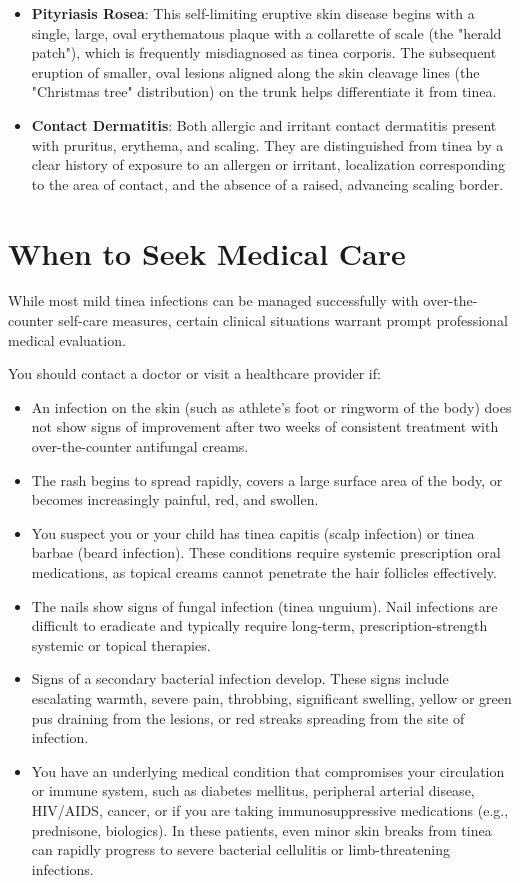 \begin{itemize}
    \item \textbf{Pityriasis Rosea}: This self-limiting eruptive skin disease begins with a single, large, oval erythematous plaque with a collarette of scale (the "herald patch"), which is frequently misdiagnosed as tinea corporis. The subsequent eruption of smaller, oval lesions aligned along the skin cleavage lines (the "Christmas tree" distribution) on the trunk helps differentiate it from tinea.
    \item \textbf{Contact Dermatitis}: Both allergic and irritant contact dermatitis present with pruritus, erythema, and scaling. They are distinguished from tinea by a clear history of exposure to an allergen or irritant, localization corresponding to the area of contact, and the absence of a raised, advancing scaling border.
\end{itemize}

\section*{When to Seek Medical Care}
While most mild tinea infections can be managed successfully with over-the-counter self-care measures, certain clinical situations warrant prompt professional medical evaluation.

You should contact a doctor or visit a healthcare provider if:
\begin{itemize}
    \item An infection on the skin (such as athlete's foot or ringworm of the body) does not show signs of improvement after two weeks of consistent treatment with over-the-counter antifungal creams.
    \item The rash begins to spread rapidly, covers a large surface area of the body, or becomes increasingly painful, red, and swollen.
    \item You suspect you or your child has tinea capitis (scalp infection) or tinea barbae (beard infection). These conditions require systemic prescription oral medications, as topical creams cannot penetrate the hair follicles effectively.
    \item The nails show signs of fungal infection (tinea unguium). Nail infections are difficult to eradicate and typically require long-term, prescription-strength systemic or topical therapies.
    \item Signs of a secondary bacterial infection develop. These signs include escalating warmth, severe pain, throbbing, significant swelling, yellow or green pus draining from the lesions, or red streaks spreading from the site of infection.
    \item You have an underlying medical condition that compromises your circulation or immune system, such as diabetes mellitus, peripheral arterial disease, HIV/AIDS, cancer, or if you are taking immunosuppressive medications (e.g., prednisone, biologics). In these patients, even minor skin breaks from tinea can rapidly progress to severe bacterial cellulitis or limb-threatening infections.
\end{itemize}

